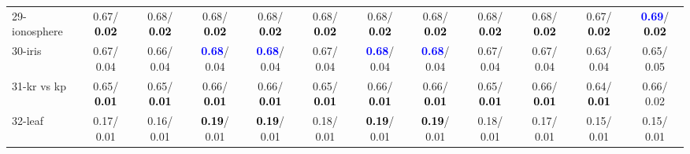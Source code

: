 \begin{table}[h]
\begin{center}
{\begin{tabular}{lc|c|c|c|c|c|c|c|c|c|c}
29-ionosphere &   0.67/\textcolor{black}{\textbf{  0.02}} &   0.68/\textcolor{black}{\textbf{  0.02}} &   0.68/\textcolor{black}{\textbf{  0.02}} &   0.68/\textcolor{black}{\textbf{  0.02}} &   0.68/\textcolor{black}{\textbf{  0.02}} &   0.68/\textcolor{black}{\textbf{  0.02}} &   0.68/\textcolor{black}{\textbf{  0.02}} &   0.68/\textcolor{black}{\textbf{  0.02}} &   0.68/\textcolor{black}{\textbf{  0.02}} &   0.67/\textcolor{black}{\textbf{  0.02}} & \textcolor{blue}{\textbf{  0.69}}/\textcolor{black}{\textbf{  0.02}} \\
30-iris &   0.67/  0.04 &   0.66/  0.04 & \textcolor{blue}{\textbf{  0.68}}/  0.04 & \textcolor{blue}{\textbf{  0.68}}/  0.04 &   0.67/  0.04 & \textcolor{blue}{\textbf{  0.68}}/  0.04 & \textcolor{blue}{\textbf{  0.68}}/  0.04 &   0.67/  0.04 &   0.67/  0.04 &   0.63/  0.04 &   0.65/  0.05 \\
31-kr vs kp &   0.65/\textcolor{black}{\textbf{  0.01}} &   0.65/\textcolor{black}{\textbf{  0.01}} &   0.66/\textcolor{black}{\textbf{  0.01}} &   0.66/\textcolor{black}{\textbf{  0.01}} &   0.65/\textcolor{black}{\textbf{  0.01}} &   0.66/\textcolor{black}{\textbf{  0.01}} &   0.66/\textcolor{black}{\textbf{  0.01}} &   0.65/\textcolor{black}{\textbf{  0.01}} &   0.66/\textcolor{black}{\textbf{  0.01}} &   0.64/\textcolor{black}{\textbf{  0.01}} &   0.66/  0.02 \\
32-leaf &   0.17/  0.01 &   0.16/  0.01 & \textcolor{black}{\textbf{  0.19}}/  0.01 & \textcolor{black}{\textbf{  0.19}}/  0.01 &   0.18/  0.01 & \textcolor{black}{\textbf{  0.19}}/  0.01 & \textcolor{black}{\textbf{  0.19}}/  0.01 &   0.18/  0.01 &   0.17/  0.01 &   0.15/  0.01 &   0.15/  0.01 \\\end{tabular}
}\label{strats0aCIELM}
\end{center}
\end{table}
